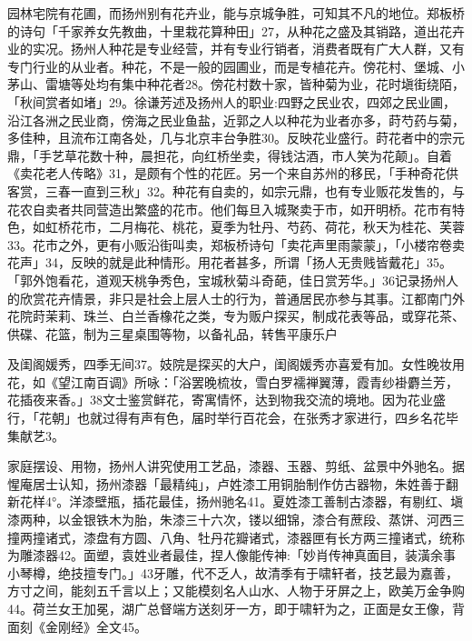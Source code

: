 园林宅院有花圃，而扬州别有花卉业，能与京城争胜，可知其不凡的地位。郑板桥的诗句「千家养女先教曲，十里栽花算种田」27，从种花之盛及其销路，道出花卉业的实况。扬州人种花是专业经营，并有专业行销者，消费者既有广大人群，又有专门行业的从业者。种花，不是一般的园圃业，而是专植花卉。傍花村、堡城、小茅山、雷塘等处均有集中种花者28。傍花村数十家，皆种菊为业，花时塡街绕陌，「秋间赏者如堵」29。徐谦芳述及扬州人的职业:四野之民业农，四郊之民业圃，沿江各洲之民业商，傍海之民业鱼盐，近郭之人以种花为业者亦多，莳芍药与菊，多佳种，且流布江南各处，几与北京丰台争胜30。反映花业盛行。莳花者中的宗元鼎，「手艺草花数十种，晨担花，向红桥坐卖，得钱沽酒，市人笑为花颠」。自着《卖花老人传略》31，是颇有个性的花匠。另一个来自苏州的移民，「手种奇花供客赏，三春一直到三秋」32。种花有自卖的，如宗元鼎，也有专业贩花发售的，与花农自卖者共同营造出繁盛的花市。他们每旦入城聚卖于市，如开明桥。花市有特色，如虹桥花市，二月梅花、桃花，夏季为牡丹、芍药、荷花，秋天为桂花、芙蓉33。花市之外，更有小贩沿街叫卖，郑板桥诗句「卖花声里雨蒙蒙」，「小楼帘卷卖花声」34，反映的就是此种情形。用花者甚多，所谓「扬人无贵贱皆戴花」35。「郭外饱看花，道观天桃争秀色，宝城秋菊斗奇葩，佳日赏芳华。」36记录扬州人的欣赏花卉情景，非只是社会上层人士的行为，普通居民亦参与其事。江都南门外花院莳茉莉、珠兰、白兰香橡花之类，专为贩户探买，制成花表等品，或穿花茶、供碟、花篮，制为三星桌围等物，以备礼品，转售平康乐户

\vfill
\begin{BookNotes}
\end{BookNotes}

\noindent 及闺阁媛秀，四季无间37。妓院是探买的大户，闺阁媛秀亦喜爱有加。女性晚妆用花，如《望江南百调》所咏：「浴罢晚梳妆，雪白罗襦禅翼薄，霞青纱褂麝兰芳，花插夜来香。」38文士鉴赏鲜花，寄寓情怀，达到物我交流的境地。因为花业盛行，「花朝」也就过得有声有色，届时举行百花会，在张秀才家进行，四乡名花毕集献艺3。

家庭摆设、用物，扬州人讲究使用工艺品，漆器、玉器、剪纸、盆景中外驰名。据惺庵居士认知，扬州漆器「最精纯」，卢姓漆工用铜胎制作仿古器物，朱姓善于翻新花样4°。洋漆壁瓶，插花最佳，扬州驰名41。夏姓漆工善制古漆器，有剔红、塡漆两种，以金银铁木为胎，朱漆三十六次，镂以细锦，漆合有蔗段、蒸饼、河西三撞两撞诸式，漆盘有方圆、八角、牡丹花瓣诸式，漆器匣有长方两三撞诸式，统称为雕漆器42。面塑，袁姓业者最佳，捏人像能传神:「妙肖传神真面目，装潢余事小琴樽，绝技擅专门。」43牙雕，代不乏人，故清季有于啸轩者，技艺最为嘉善，方寸之间，能刻五千言以上；又能模刻名人山水、人物于牙屏之上，欧美万金争购44。荷兰女王加冕，湖广总督端方送刻牙一方，即于啸轩为之，正面是女王像，背面刻《金刚经》全文45。

